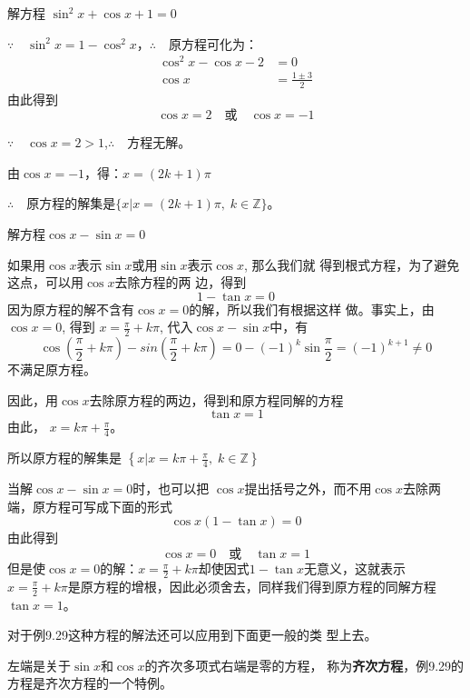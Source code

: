 \begin{example}
    解方程 $\sin^2 x+\cos x+1=0$
\end{example}

\begin{solution}
$\because\quad \sin^2 x=1-\cos^2x$，\qquad $\therefore\quad $原方程可化为：
\[\begin{split}
    \cos^2x-\cos x-2&=0\\
    \cos x&=\frac{1\pm 3}{2}
\end{split}\]
由此得到
\[\cos x=2\quad \text{或}\quad \cos x=-1\]

$\because\quad \cos x=2>1$,\qquad  $\therefore\quad $方程无解。

由$ \cos x=-1$，得：$x=(2k+1)\pi$

$\therefore\quad $原方程的解集是$\{x|x=(2k+1)\pi,\; k\in\mathbb{Z}\}$。
\end{solution}

\begin{example}
    解方程$\cos x-\sin x=0$
\end{example}

\begin{solution}
    如果用$\cos x$表示$\sin x$或用$\sin x$表示$\cos x$, 那么我们就
    得到根式方程，为了避免这点，可以用$\cos x$去除方程的两
    边，得到
    \[1-\tan x=0\]
    因为原方程的解不含有$\cos x=0$的解，所以我们有根据这样
    做。事实上，由$\cos x=0$, 得到
    $x=\frac{\pi}{2}+k\pi$, 代入$\cos x-\sin x$中，有
   \[ \cos\left(\frac{\pi}{2}+k\pi \right)-sin\left(\frac{\pi}{2}+k\pi \right)=0-(-1)^k\sin \frac{\pi}{2}=(-1)^{k+1}\ne 0\]
    不满足原方程。
    
    因此，用$\cos x$去除原方程的两边，得到和原方程同解的方程
    \[\tan x=1\]
    由此，
   $ x=k\pi +\frac{\pi}{4}$。

   所以原方程的解集是
$\left\{x\Big|x=k\pi+\frac{\pi}{4},\; k\in\mathbb{Z}\right\}$
\end{solution}

\begin{rmk}
当解$\cos x-\sin x=0$时，也可以把
$\cos x$提出括号之外，而不用$\cos x$去除两端，原方程可写成下面的形式
$$\cos x (1-\tan x)=0$$
由此得到
$$\cos x=0\quad \text{或}\quad \tan x=1$$
但是使$\cos x=0$的解：$x=\frac{\pi}{2}+k\pi$却使因式$1-\tan x$无意义，这就表示$x=\frac{\pi}{2}+k\pi$是原方程的增根，因此必须舍去，同样我们得到原方程的同解方程
$\tan x=1$。

对于例9.29这种方程的解法还可以应用到下面更一般的类
型上去。

左端是关于$\sin x$和$\cos x$的齐次多项式右端是零的方程，
称为\textbf{齐次方程}，例9.29的方程是齐次方程的一个特例。
\end{rmk}




